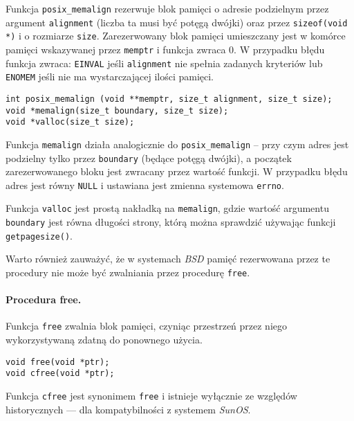 \documentclass[12pt,a4paper,titlepage,twoside]{mwart}
\begin{document}
Funkcja \texttt{posix\_memalign} rezerwuje blok pamięci o adresie podzielnym
przez argument \texttt{alignment} (liczba ta musi być potęgą dwójki) oraz przez
\texttt{sizeof(void *)} i o rozmiarze \texttt{size}. Zarezerwowany blok pamięci
umieszczany jest w komórce pamięci wskazywanej przez \texttt{memptr} i funkcja
zwraca $0$. W przypadku błędu funkcja zwraca: \texttt{EINVAL} jeśli
\texttt{alignment} nie spełnia zadanych kryteriów lub \texttt{ENOMEM} jeśli nie
ma wystarczającej ilości pamięci.

\vspace{2ex}
\begin{lstlisting}[caption={Prototyp procedury \texttt{posix\_memalign}, \texttt{memalign} i \texttt{valloc}.},xleftmargin=0cm,xrightmargin=0cm]
int posix_memalign (void **memptr, size_t alignment, size_t size);
void *memalign(size_t boundary, size_t size);
void *valloc(size_t size);
\end{lstlisting}

Funkcja \texttt{memalign} działa analogicznie do \texttt{posix\_memalign} --
przy czym adres jest podzielny tylko przez \texttt{boundary} (będące potęgą
dwójki), a początek zarezerwowanego bloku jest zwracany przez wartość funkcji.
W przypadku błędu adres jest równy \texttt{NULL} i ustawiana jest zmienna
systemowa \texttt{errno}.

Funkcja \texttt{valloc} jest prostą nakładką na \texttt{memalign}, gdzie
wartość argumentu \texttt{boundary} jest równa długości strony, którą można
sprawdzić używając funkcji \texttt{getpagesize()}.

Warto również zauważyć, że w systemach \textit{BSD} pamięć rezerwowana przez te
procedury nie może być zwalniania przez procedurę \texttt{free}.

\paragraph{Procedura free.}

Funkcja \texttt{free} zwalnia blok pamięci, czyniąc przestrzeń przez niego
wykorzystywaną zdatną do ponownego użycia.

\vspace{2ex}
\begin{lstlisting}[caption={Prototyp procedury \texttt{free} i \texttt{cfree}.}]
void free(void *ptr);
void cfree(void *ptr);
\end{lstlisting}

Funkcja \texttt{cfree} jest synonimem \texttt{free} i istnieje wyłącznie ze
względów historycznych --- dla kompatybilności z systemem \textit{SunOS}.
\end{document}
